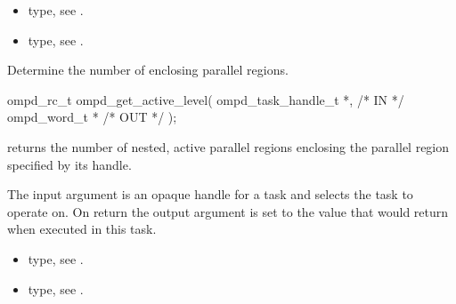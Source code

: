 \crossreferences
\begin{itemize}
	\item {} type, see .
	\item {} type, see .
\end{itemize}


\summary
Determine the number of enclosing  parallel regions.

\format
\cspecificstart
\begin{boxedcode}
ompd\_rc\_t ompd\_get\_active\_level(
  ompd\_task\_handle\_t *,                                 /* IN */
  ompd\_word\_t *                                         /* OUT */
); 
\end{boxedcode}
\cspecificend

\descr
{} returns the number of nested, active
parallel regions enclosing the parallel region specified by its handle.

\argdesc
The input argument  is an opaque handle for a task and selects the task to operate on.
On return the output argument  is set to the value that  would return when
executed in this task.

\crossreferences
\begin{itemize}
	\item {} type, see .
	\item {} type, see .
\end{itemize}

%
%
%


